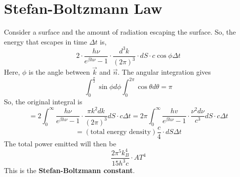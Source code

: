 \documentclass[../main.tex]{subfiles}
\begin{document}
\section{Stefan-Boltzmann Law}
Consider a surface and the amount of radiation escaping the surface. So,
the energy that escapes in time $\Delta t$ is,
$$2\cdot\frac{h\nu}{e^{\beta h\nu}-1}\cdot\frac{d^{3}k}{(2\pi)^{3}}\cdot dS\cdot c\cos \phi\Delta t$$
Here, $\phi$ is the angle between $\vec{k}$ and $\vec{n}$. The angular integration gives
$$\int_{0}^{\frac{\pi}{2}}\sin\phi d\phi\int_{0}^{2\pi}\cos\theta d\theta
=\pi$$
So, the original integral is
$$=2\int_{0}^{\infty}\frac{h\nu}{e^{\beta h\nu}-1}\cdot\frac{\pi k^{2}dk}{(2\pi)^{3}}dS\cdot c\Delta t
=2\pi\int_{0}^{\infty}\frac{hv}{e^{\beta h\nu}-1}\cdot\frac{\nu^{2}d\nu}{c^{3}}dS\cdot c\Delta t
$$$$
=(\text{total energy density})\frac{c}{4}\cdot dS\Delta t
$$
The total power emitted will then be
$$\frac{2\pi^{5}k_{B}^{4}}{15h^{3}c}\cdot AT^{4}$$
This is the \textbf{Stefan-Boltzmann constant}.
\end{document}
